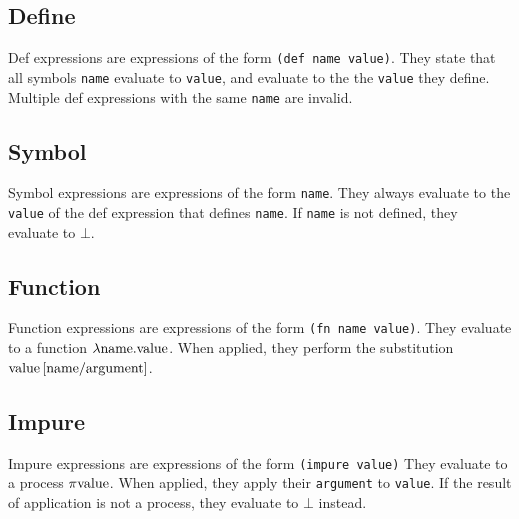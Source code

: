 \documentclass{article}
\begin{document}
    \begin{multicols}{2}
        \subsection{Define}\label{subsec:def}

        Def expressions are expressions of the form \lstinline$(def name value)$.
        They state that all symbols \lstinline$name$ evaluate to \lstinline$value$, and evaluate to the the \lstinline$value$ they define.
        Multiple def expressions with the same \lstinline$name$ are invalid.
        \newline

        \subsection{Symbol}\label{subsec:symbol}

        Symbol expressions are expressions of the form \lstinline$name$.
        They always evaluate to the \lstinline$value$ of the def expression that defines \lstinline$name$.
        If \lstinline$name$ is not defined, they evaluate to $\bot$.
        \newline

        \subsection{Function}\label{subsec:function}

        Function expressions are expressions of the form \lstinline$(fn name value)$.
        They evaluate to a function $\lambda\lstinline{name}.\lstinline{value}$.
        When applied, they perform the substitution $\lstinline{value}\left[\lstinline{name}/\lstinline{argument}\right]$.
        \newline

        \subsection{Impure}\label{subsec:impure}

        Impure expressions are expressions of the form \lstinline$(impure value)$
        They evaluate to a process $\pi\lstinline{value}$.
        When applied, they apply their \lstinline$argument$ to \lstinline$value$.
        If the result of application is not a process, they evaluate to $\bot$ instead.
        \newline


\end{multicols}
\end{document}
